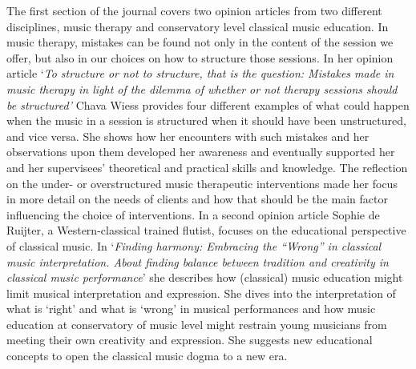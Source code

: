 \documentclass[authordate, empirical, issue]{jote-new-article}
\begin{document}
The first section of the journal covers two opinion articles from two different disciplines, music therapy and conservatory level classical music education. In music therapy, mistakes can be found not only in the content of the session we offer, but also in our choices on how to structure those sessions. In her opinion article ‘\emph{To structure or not to structure, that is the question: Mistakes made in music therapy in light of the dilemma of whether or not therapy sessions should be structured'} Chava Wiess provides four different examples of what could happen when the music in a session is structured when it should have been unstructured, and vice versa. She shows how her encounters with such mistakes and her observations upon them developed her awareness and eventually supported her and her supervisees' theoretical and practical skills and knowledge. The reflection on the under- or overstructured music therapeutic interventions made her focus in more detail on the needs of clients and how that should be the main factor influencing the choice of interventions. In a second opinion article Sophie de Ruijter, a Western-classical trained flutist, focuses on the educational perspective of classical music. In ‘\emph{Finding harmony: Embracing the “Wrong” in classical music interpretation. About finding balance between tradition and creativity in classical music performance}' she describes how (classical) music education might limit musical interpretation and expression. She dives into the interpretation of what is ‘right' and what is ‘wrong' in musical performances and how music education at conservatory of music level might restrain young musicians from meeting their own creativity and expression. She suggests new educational concepts to open the classical music dogma to a new era.
\end{document}

